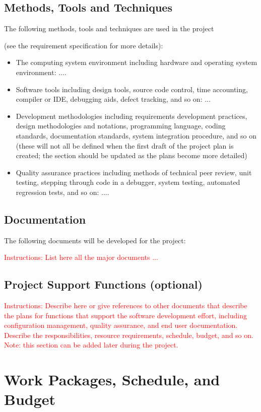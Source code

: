 \documentclass{article}
\begin{document}
\subsection{Methods, Tools and Techniques}
The following methods, tools and techniques are used in the project {\color{red} (see the
requirement specification for more details):


\begin{itemize}
\item The computing system environment including hardware and operating system environment: ....
\item Software tools including design tools, source code control, time accounting, compiler or IDE, debugging aids, defect tracking, and so on: ...
\item Development methodologies including requirements development practices, design methodologies and notations, programming language, coding standards, documentation standards, system integration procedure, and so on (these will not all be defined when the first draft of the project plan is created; the section should be updated as the plans become more detailed)
\item Quality assurance practices including methods of technical peer review, unit testing, stepping through code in a debugger, system testing, automated regression tests, and so on: ....
\end{itemize}
}

\subsection{Documentation}
The following documents will be developed for the project:

\textcolor{red}{Instructions: List here all the major documents ...}

\subsection{Project Support Functions (optional)}
\textcolor{red}{
Instructions: Describe here or give references to other documents that describe
the plans for functions that support the software development effort, including
configuration management, quality assurance, and end user documentation.
Describe the responsibilities, resource requirements, schedule, budget, and so
on. Note: this section can be added later during the project.}

\section{Work Packages, Schedule, and Budget}
\end{document}

